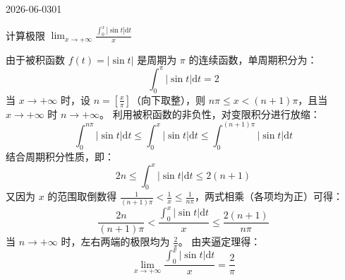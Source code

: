 \begin{mistake}{2026-06-03}{01}

\begin{problemcontent}
计算极限 \(\lim_{x \to +\infty} \frac{\int_0^x |\sin t| \mathrm{d}t}{x}\)
\end{problemcontent}

\begin{solutioncontent}
由于被积函数 \(f(t) = |\sin t|\) 是周期为 \(\pi\) 的连续函数，单周期积分为：
\[ \int_0^\pi |\sin t| \mathrm{d}t = 2 \]
当 \(x \to +\infty\) 时，设 \(n = \left[ \frac{x}{\pi} \right]\)（向下取整），则 \(n\pi \le x < (n+1)\pi\)，且当 \(x \to +\infty\) 时 \(n \to +\infty\)。
利用被积函数的非负性，对变限积分进行放缩：
\[ \int_0^{n\pi} |\sin t| \mathrm{d}t \le \int_0^x |\sin t| \mathrm{d}t \le \int_0^{(n+1)\pi} |\sin t| \mathrm{d}t \]
结合周期积分性质，即：
\[ 2n \le \int_0^x |\sin t| \mathrm{d}t \le 2(n+1) \]
又因为 \(x\) 的范围取倒数得 \(\frac{1}{(n+1)\pi} < \frac{1}{x} \le \frac{1}{n\pi}\)，两式相乘（各项均为正）可得：
\[ \frac{2n}{(n+1)\pi} < \frac{\int_0^x |\sin t| \mathrm{d}t}{x} \le \frac{2(n+1)}{n\pi} \]
当 \(n \to +\infty\) 时，左右两端的极限均为 \(\frac{2}{\pi}\)。
由夹逼定理得：
\[ \lim_{x \to +\infty} \frac{\int_0^x |\sin t| \mathrm{d}t}{x} = \frac{2}{\pi} \]
\end{solutioncontent}


\end{mistake}

